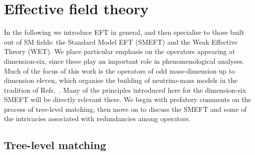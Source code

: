\section{Effective field theory}

In the following we introduce EFT in general, and then specialise to those built
out of SM fields: the Standard Model EFT (SMEFT) and the Weak Effective Theory
(WET). We place particular emphasis on the operators appearing at dimension-six,
since these play an important role in phenomenological analyses. Much of the
focus of this work is the operators of odd mass-dimension up to dimension
eleven, which organise the building of neutrino-mass models in the tradition of
Refs.~\cite{Babu:2001ex, deGouvea:2007qla, PhysRevD.87.073007, Cai:2014kra}.
Many of the principles introduced here for the dimension-six SMEFT will be
directly relevant there. We begin with prefatory comments on the process of
tree-level matching, then move on to discuss the SMEFT and some of the
intricacies associated with redundancies among operators.

\subsection{Tree-level matching}

